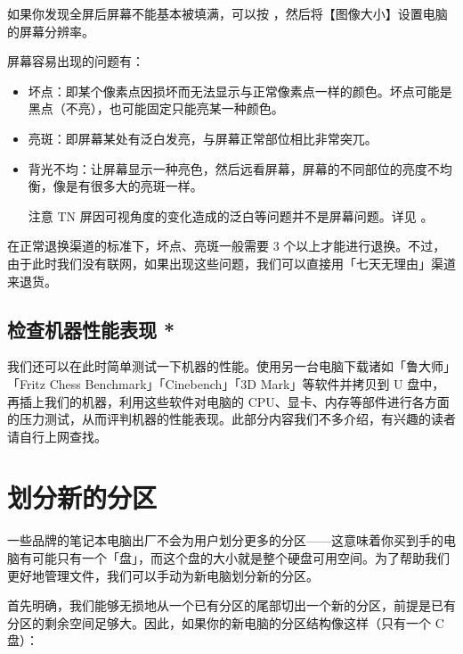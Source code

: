 \begin{note}
  如果你发现全屏后屏幕不能基本被填满，可以按 ，然后将【图像大小】设置电脑的屏幕分辨率。
\end{note}

屏幕容易出现的问题有：

\begin{itemize}
  \item 坏点：即某个像素点因损坏而无法显示与正常像素点一样的颜色。坏点可能是黑点（不亮），也可能固定只能亮某一种颜色。
  \item 亮斑：即屏幕某处有泛白发亮，与屏幕正常部位相比非常突兀。
  \item 背光不均：让屏幕显示一种亮色，然后远看屏幕，屏幕的不同部位的亮度不均衡，像是有很多大的亮斑一样。
  \begin{note}
    注意 TN 屏因可视角度的变化造成的泛白等问题并不是屏幕问题。详见 。
  \end{note}
\end{itemize}

在正常退换渠道的标准下，坏点、亮斑一般需要 3 个以上才能进行退换。不过，由于此时我们没有联网，如果出现这些问题，我们可以直接用「七天无理由」渠道来退货。

\subsection{检查机器性能表现 *}

我们还可以在此时简单测试一下机器的性能。使用另一台电脑下载诸如「鲁大师」「Fritz Chess Benchmark」「Cinebench」「3D Mark」等软件并拷贝到 U 盘中，再插上我们的机器，利用这些软件对电脑的 CPU、显卡、内存等部件进行各方面的压力测试，从而评判机器的性能表现。此部分内容我们不多介绍，有兴趣的读者请自行上网查找。

\section{划分新的分区}

一些品牌的笔记本电脑出厂不会为用户划分更多的分区——这意味着你买到手的电脑有可能只有一个「盘」，而这个盘的大小就是整个硬盘可用空间。为了帮助我们更好地管理文件，我们可以手动为新电脑划分新的分区。

首先明确，我们能够无损地从一个已有分区的尾部切出一个新的分区，前提是已有分区的剩余空间足够大。因此，如果你的新电脑的分区结构像这样（只有一个 C 盘）：

